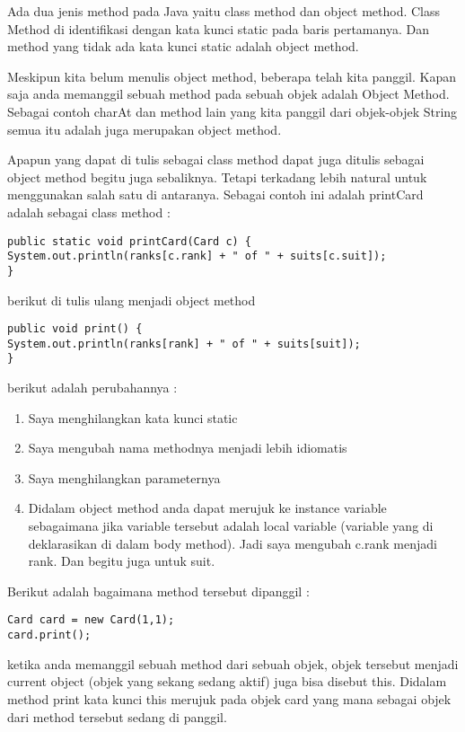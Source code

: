 Ada dua jenis method pada Java yaitu class method dan object method. Class Method di identifikasi dengan kata kunci static pada baris pertamanya. Dan method yang tidak ada kata kunci static adalah object method.

Meskipun kita belum menulis object method, beberapa telah kita panggil. Kapan saja anda memanggil sebuah method pada sebuah objek adalah Object Method. Sebagai contoh charAt dan method lain yang kita panggil dari objek-objek String semua itu adalah juga merupakan object method. 

Apapun yang dapat di tulis sebagai class method dapat juga ditulis sebagai object method begitu juga sebaliknya. Tetapi terkadang lebih natural untuk menggunakan salah satu di antaranya.
Sebagai contoh ini adalah printCard adalah sebagai class method :

\begin{lstlisting}
public static void printCard(Card c) {
System.out.println(ranks[c.rank] + " of " + suits[c.suit]);
}
\end{lstlisting}

berikut di tulis ulang menjadi object method 

\begin{lstlisting}
public void print() {
System.out.println(ranks[rank] + " of " + suits[suit]);
}
\end{lstlisting}

berikut adalah perubahannya :
\begin{enumerate}
	\item Saya menghilangkan kata kunci static
	\item Saya mengubah nama methodnya menjadi lebih idiomatis
	\item Saya menghilangkan parameternya
	\item Didalam object method anda dapat merujuk ke instance variable sebagaimana jika variable tersebut adalah local variable (variable yang di deklarasikan di dalam body method). Jadi saya mengubah c.rank menjadi rank. Dan begitu juga untuk suit.
\end{enumerate}

Berikut adalah bagaimana method tersebut dipanggil :
\begin{lstlisting}
Card card = new Card(1,1);
card.print();
\end{lstlisting}

ketika anda memanggil sebuah method dari sebuah objek, objek tersebut menjadi current object (objek yang sekang sedang aktif) juga bisa disebut this. Didalam method print kata kunci this merujuk pada objek card yang mana sebagai objek dari method tersebut sedang di panggil.